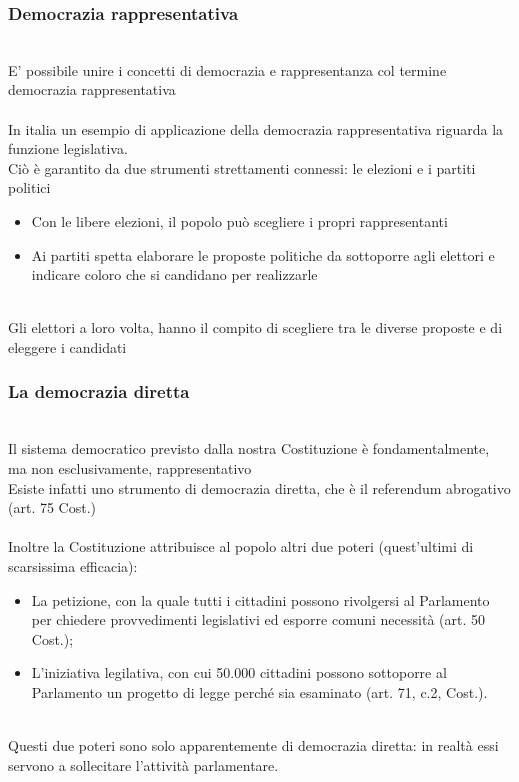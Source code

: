 \documentclass{report}
\begin{document}
\subsubsection{Democrazia rappresentativa}
\\
E' possibile unire i concetti di democrazia e rappresentanza col termine democrazia rappresentativa
\\
\\
In italia un esempio di applicazione della democrazia rappresentativa riguarda la funzione legislativa.
\\
Ciò è garantito da due strumenti strettamenti connessi: le elezioni e i partiti politici
\\
\begin{itemize}
  \item Con le libere elezioni, il popolo può scegliere i propri rappresentanti
  \item Ai partiti spetta elaborare le proposte politiche da sottoporre agli elettori e indicare coloro che si candidano per realizzarle
\end{itemize}
\\
Gli elettori a loro volta, hanno il compito di scegliere tra le diverse proposte e di eleggere i candidati
\\
\subsubsection{La democrazia diretta}
\\
Il sistema democratico previsto dalla nostra Costituzione è fondamentalmente, ma non esclusivamente, rappresentativo
\\
Esiste infatti uno strumento di democrazia diretta, che è il referendum abrogativo (art. 75 Cost.)
\\
\\
Inoltre la Costituzione attribuisce al popolo altri due poteri (quest'ultimi di scarsissima efficacia):
\\
\begin{itemize}
  \item La petizione, con la quale tutti i cittadini possono rivolgersi al Parlamento per chiedere provvedimenti legislativi ed esporre comuni necessità (art. 50 Cost.);
  \item L'iniziativa legilativa, con cui 50.000 cittadini possono sottoporre al Parlamento un progetto di legge perché sia esaminato (art. 71, c.2, Cost.).
\end{itemize}
\\
Questi due poteri sono solo apparentemente di democrazia diretta: in realtà essi servono a sollecitare l'attività parlamentare.
\\
\end{document}
